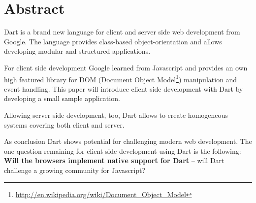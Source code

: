 \section{Abstract}

Dart is a brand new language for client and server side web development from Google. The language provides class-based object-orientation and allows developing modular and structured applications.

For client side development Google learned from Javascript and provides an own high featured library for DOM (Document Object Model\footnote{\url{http://en.wikipedia.org/wiki/Document_Object_Model}}) manipulation and event handling. This paper will introduce client side development with Dart by developing a small sample application.

Allowing server side development, too, Dart allows to create homogeneous systems covering both client and server.



As conclusion Dart shows potential for challenging modern web development. The one question remaining for client-side development using Dart is the following: \textbf{Will the browsers implement native support for Dart} -- will Dart challenge a growing community for Javascript?